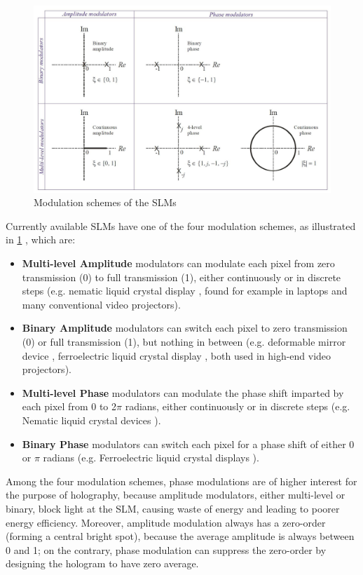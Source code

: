 \begin{figure}[H]
  \centering
  \includegraphics[width=1.0\textwidth]{modulation_loci.jpg}
  \caption{Modulation schemes of the SLMs \cite{Cable2006}} \label{fig:modulation_loci}
\end{figure}

Currently available SLMs have one of the four modulation schemes, as illustrated in \cref{fig:modulation_loci} \cite{Cable2006}, which are:

\begin{itemize}
  \item \textbf{Multi-level Amplitude} modulators can modulate each pixel from zero transmission (0) to full transmission (1), either continuously or in discrete steps (e.g. nematic liquid crystal display \cite{Schadt1971}, found for example in laptops and many conventional video projectors).
  \item \textbf{Binary Amplitude} modulators can switch each pixel to zero transmission (0) or full transmission (1), but nothing in between (e.g. deformable mirror device \cite{Pape1983}, ferroelectric liquid crystal display \cite{Johnson1993}, both used in high-end video projectors).
  \item \textbf{Multi-level Phase} modulators can modulate the phase shift imparted by each pixel from 0 to 2$\pi$ radians, either continuously or in discrete steps (e.g. Nematic liquid crystal devices \cite{Lee2004}).
  \item \textbf{Binary Phase} modulators can switch each pixel for a phase shift of either 0 or $\pi$ radians (e.g. Ferroelectric liquid crystal displays \cite{Broomfield1992}).
\end{itemize}

Among the four modulation schemes, phase modulations are of higher interest for the purpose of holography, because amplitude modulators, either multi-level or binary, block light at the SLM, causing waste of energy and leading to poorer energy efficiency. Moreover, amplitude modulation always has a zero-order (forming a central bright spot), because the average amplitude is always between 0 and 1; on the contrary, phase modulation can suppress the zero-order by designing the hologram to have zero average.

